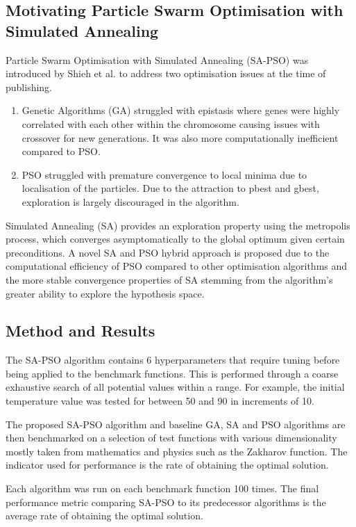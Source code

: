 \documentclass[a4paper, 12pt]{extarticle}
\begin{document}
\subsection{Motivating Particle Swarm Optimisation with Simulated Annealing}

Particle Swarm Optimisation with Simulated Annealing (SA-PSO) was introduced by Shieh et al. \cite{shieh2011modified} to address two optimisation issues at the time of publishing.

\begin{enumerate}
    \item Genetic Algorithms (GA) struggled with epistasis where genes were highly correlated with each other within the chromosome causing issues with crossover for new generations. It was also more computationally inefficient compared to PSO.
    \item PSO struggled with premature convergence to local minima due to localisation of the particles. Due to the attraction to pbest and gbest, exploration is largely discouraged in the algorithm.
\end{enumerate}

Simulated Annealing (SA) provides an exploration property using the metropolis process, which converges asymptomatically to the global optimum given certain preconditions. 
A novel SA and PSO hybrid approach is proposed due to the computational efficiency of PSO compared to other optimisation algorithms and the more stable convergence properties of SA stemming from the algorithm’s greater ability to explore the hypothesis space. 

\subsection{Method and Results}

The SA-PSO algorithm contains 6 hyperparameters that require tuning before being applied to the benchmark functions. This is performed through a coarse exhaustive search of all potential values within a range. For example, the initial temperature value was tested for between 50 and 90 in increments of 10.

The proposed SA-PSO algorithm and baseline GA, SA and PSO algorithms are then benchmarked on a selection of test functions with various dimensionality mostly taken from mathematics and physics such as the Zakharov function. The indicator used for performance is the rate of obtaining the optimal solution.

Each algorithm was run on each benchmark function 100 times. The final performance metric comparing SA-PSO to its predecessor algorithms is the average rate of obtaining the optimal solution.
\end{document}
